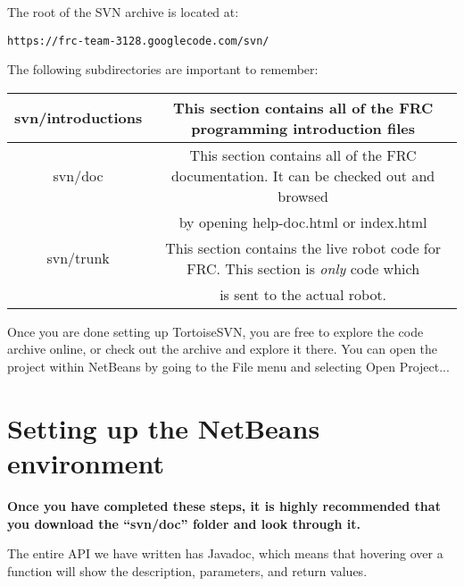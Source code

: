 \documentclass[a4paper]{article}
\begin{document}
The root of the SVN archive is located at: \begin{verbatim}https://frc-team-3128.googlecode.com/svn/\end{verbatim}

The following subdirectories are important to remember:

\noindent\begin{tabular}{|c|c|}
\hline svn/introductions & This section contains all of the FRC programming introduction files\\
\hline svn/doc & This section contains all of the FRC documentation. It can be checked out and browsed\\ & by opening help-doc.html or index.html\\
\hline svn/trunk & This section contains the live robot code for FRC. This section is \textit{only} code which \\ & is sent to the actual robot.\\\hline
\end{tabular}

Once you are done setting up TortoiseSVN, you are free to explore the code archive online, or check out the archive and explore it there. You can open the project within NetBeans by going to the File menu and selecting Open Project...

\section{Setting up the NetBeans environment}

\textbf{Once you have completed these steps, it is highly recommended that you download the ``svn/doc'' folder and look through it.}

The entire API we have written has Javadoc, which means that hovering over a function will show the description, parameters, and return values.
\end{document}
